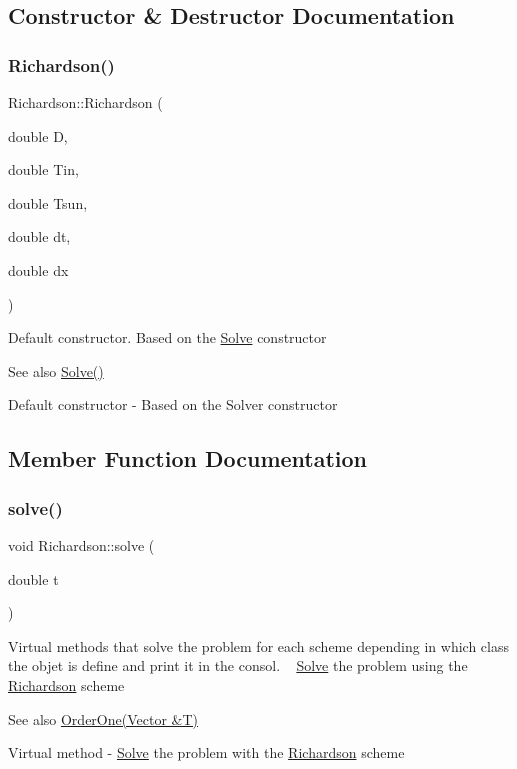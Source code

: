 \subsection{Constructor \& Destructor Documentation}
\mbox{\label{class_richardson_ab669d2d69be9d899d5ca2bb7a7c33a5b}} 
\subsubsection{\texorpdfstring{Richardson()}{Richardson()}}
{\footnotesize\ttfamily Richardson\+::\+Richardson (\begin{DoxyParamCaption}\item[{double}]{D,  }\item[{double}]{Tin,  }\item[{double}]{Tsun,  }\item[{double}]{dt,  }\item[{double}]{dx }\end{DoxyParamCaption})}

Default constructor. Based on the \hyperlink{class_solve}{Solve} constructor \begin{DoxySeeAlso}{See also}
\hyperlink{class_solve_a1e0efad6dcf6b09759dd38df7aa08db8}{Solve()}
\end{DoxySeeAlso}
Default constructor -\/ Based on the Solver constructor 

\subsection{Member Function Documentation}
\mbox{\label{class_richardson_ab8dd2ff0e58c11092fead4d45a4f5c64}} 
\subsubsection{\texorpdfstring{solve()}{solve()}}
{\footnotesize\ttfamily void Richardson\+::solve (\begin{DoxyParamCaption}\item[{double}]{t }\end{DoxyParamCaption})\hspace{0.3cm}{\ttfamily [virtual]}}

Virtual methods that solve the problem for each scheme depending in which class the objet is define and print it in the consol. ~\newline
 \hyperlink{class_solve}{Solve} the problem using the \hyperlink{class_richardson}{Richardson} scheme \begin{DoxySeeAlso}{See also}
\hyperlink{class_explicit_a6069720017eb2bb0d989b2557c162c97}{Order\+One(\+Vector \&\+T)}
\end{DoxySeeAlso}
Virtual method -\/ \hyperlink{class_solve}{Solve} the problem with the \hyperlink{class_richardson}{Richardson} scheme 

